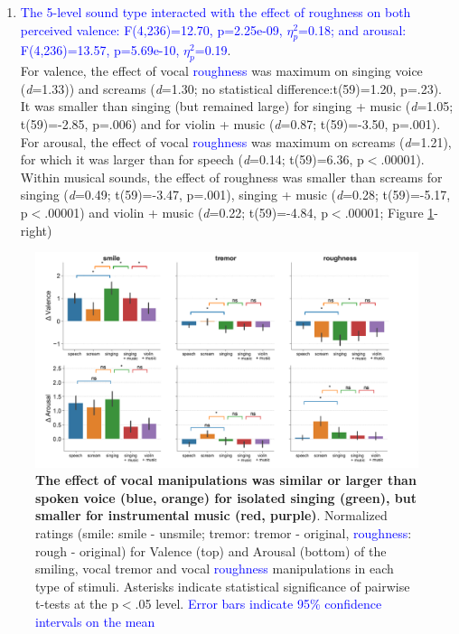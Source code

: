 \documentclass[openacc]{rsprocb_new}%
\begin{document}
\begin{enumerate}
 \item \textcolor{blue}{The 5-level sound type interacted with the effect of roughness on both perceived valence: F(4,236)=12.70, p=2.25e-09, $\eta_p^2$=0.18; and arousal: F(4,236)=13.57, p=5.69e-10, $\eta_p^2$=0.19}.\\ For valence, the effect of vocal \textcolor{blue}{roughness} was maximum on singing voice (\emph{d}=1.33)) and screams (\emph{d}=1.30; no statistical difference:t(59)=1.20, p=.23). It was smaller than singing (but remained large) for singing + music (\emph{d}=1.05; t(59)=-2.85, p=.006) and for violin + music (\emph{d}=0.87; t(59)=-3.50, p=.001).\\ For arousal, the effect of vocal \textcolor{blue}{roughness} was maximum on screams (\emph{d}=1.21), for which it was larger than for speech (\emph{d}=0.14; t(59)=6.36, p$<$.00001). Within musical sounds, the effect of roughness was smaller than screams for singing (\emph{d}=0.49; t(59)=-3.47, p=.001), singing + music (\emph{d}=0.28; t(59)=-5.17, p$<$.00001) and violin + music (\emph{d}=0.22; t(59)=-4.84, p$<$.00001; Figure \ref{sound_type}-right)  
\end{enumerate}
\vskip -15pt

\begin{figure}[htbp]
\centerline{\includegraphics[width=\textwidth]{pics/Figure_3.pdf}}
\caption{{\bf The effect of vocal manipulations was similar or larger than spoken voice (blue, orange) for isolated singing (green), but smaller for instrumental music (red, purple)}. Normalized ratings  (smile: smile - unsmile; tremor: tremor - original, \textcolor{blue}{roughness}: rough - original) for Valence (top) and Arousal (bottom) of the smiling, vocal tremor and vocal \textcolor{blue}{roughness} manipulations in each type of stimuli. Asterisks indicate statistical significance of pairwise t-tests at the p$<$.05 level. \textcolor{blue}{Error bars indicate 95\% confidence intervals on the mean}}
\label{sound_type}
\end{figure}
\end{document}
